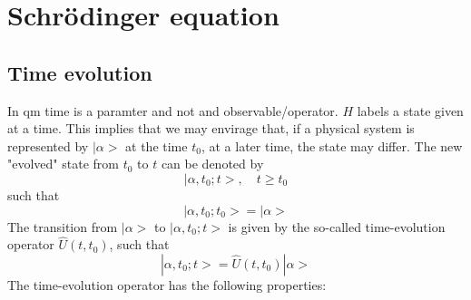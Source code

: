 \section{Schrödinger equation}
\subsection{Time evolution}
In qm time is a paramter and not and observable/operator.
$H$ labels a state given at a time. This implies that we may
envirage that, if a physical system is represented by
$|\alpha>$ at the time $t_0$, at a later time, the state may
differ. The new "evolved" state from $t_0$ to $t$ can be
denoted by
$$
|\alpha,t_0;t>, \quad t \geq t_0
$$
such that
$$
|\alpha,t_0;t_0> = |\alpha>
$$
The transition from $|\alpha>$ to $|\alpha,t_0;t>$ is given
by the so-called time-evolution operator $\hat{U}(t,t_0)$,
such that
\begin{equation}
  |\alpha,t_0;t> = \hat{U}(t,t_0) |\alpha>
  \label{equ:2.1}
\end{equation}
The time-evolution operator has the following properties:
